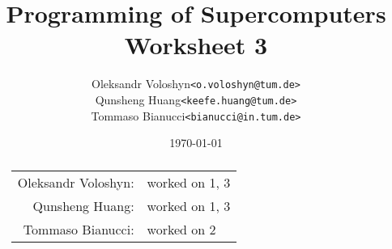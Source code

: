 \documentclass{article}
\title{Programming of Supercomputers\\Worksheet 3}
\author{
	\begin{tabular}{rl}
		Oleksandr Voloshyn& \texttt{<o.voloshyn@tum.de>}\\ 
		Qunsheng Huang& \texttt{<keefe.huang@tum.de>}\\ 
		Tommaso Bianucci& \texttt{<bianucci@in.tum.de>}
	\end{tabular}
}
\date{\today}
\begin{document}
\maketitle
\renewcommand{\abstractname}{Group members's contributions}
\begin{abstract}
	\begin{center}
		\begin{tabular}{rl}
		Oleksandr Voloshyn:& worked on 1, 3\\
		Qunsheng Huang:& worked on 1, 3\\
		Tommaso Bianucci:& worked on 2
		\end{tabular}
	\end{center}
\end{abstract}




\end{document}
